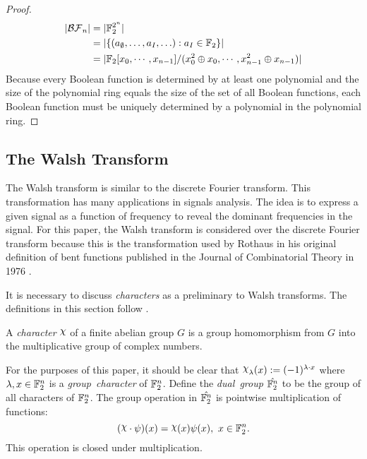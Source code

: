 \begin{proof}
  \begin{align*}
  \lvert\mathcal{BF}_n\rvert
    &= \lvert \mathbb{F}_2^{2^n} \rvert \\
    &= \lvert \{(a_{\emptyset},\ldots,a_I,\ldots):a_I\in\mathbb{F}_2\} \rvert \\
    &= \lvert \mathbb{F}_2[x_0,\cdots,x_{n-1}]/ (x_0^2\oplus x_0,\cdots,
    x_{n-1}^2 \oplus x_{n-1})\rvert
  \end{align*}
  Because every Boolean function is determined by at least one polynomial
  and the size of the polynomial ring equals the size of the set of all
  Boolean functions, each Boolean function must be uniquely determined by a
  polynomial in the polynomial ring.
\end{proof}

\subsection{The Walsh Transform}
\par The Walsh transform is similar to the discrete Fourier transform.
This transformation has many applications in signals
analysis. The idea is to express a given signal as a function of frequency
to reveal the dominant frequencies in the signal. For this paper, the Walsh
transform is considered over the discrete Fourier transform because this is
the transformation used by Rothaus in his original definition of bent
functions published in the Journal of Combinatorial Theory in 1976
\cite{art:r76}. 

\par It is necessary to discuss \textit{characters} as a preliminary to Walsh
transforms. The definitions in this section follow \cite{bk:lsy11}.

\begin{definition}
  A {\em character} $\Chi$ of a finite abelian group $G$ is a group
  homomorphism from $G$ into the multiplicative group of complex numbers.
\end{definition}

For the purposes of this paper, it should be clear that
$\Chi_\lambda(x):=(-1)^{\lambda\cdot x}$ where $\lambda,x\in\mathbb{F}_2^n$ is a
{\em group\ character} of $\mathbb{F}_2^n$. Define the {\em dual\ group}
$\hat{\mathbb{F}_2^n}$ to be the group of all characters of $\mathbb{F}_2^n$. The group
operation
in $\hat{\mathbb{F}_2^n}$ is pointwise multiplication of functions:
\[
(\Chi\cdot\psi)(x)=\Chi(x)\psi(x),\ x\in\gftwo^n.
\]
This operation is closed under multiplication.

